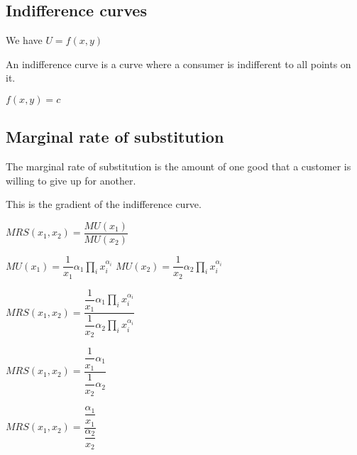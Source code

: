 
\subsection{Indifference curves}

We have \(U=f(x,y)\)

An indifference curve is a curve where a consumer is indifferent to all points on it.

\(f(x,y)=c\)

\subsection{Marginal rate of substitution}

The marginal rate of substitution is the amount of one good that a customer is willing to give up for another.

This is the gradient of the indifference curve.

\(MRS(x_1, x_2)=\dfrac{MU(x_1)}{MU(x_2)}\)

\(MU(x_1) = \dfrac{1}{x_1}\alpha_1\prod_i x_i^{\alpha_i}\)
\(MU(x_2) = \dfrac{1}{x_2}\alpha_2\prod_i x_i^{\alpha_i}\)

\(MRS(x_1, x_2)=\dfrac{\dfrac{1}{x_1}\alpha_1\prod_i x_i^{\alpha_i}}{\dfrac{1}{x_2}\alpha_2\prod_i x_i^{\alpha_i}}\)

\(MRS(x_1, x_2)=\dfrac{\dfrac{1}{x_1}\alpha_1}{\dfrac{1}{x_2}\alpha_2}\)

\(MRS(x_1, x_2)=\dfrac{\dfrac{\alpha_1}{x_1}}{\dfrac{\alpha_2}{x_2}}\)

